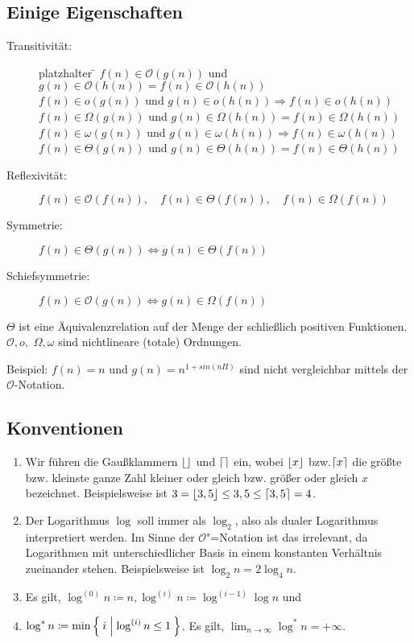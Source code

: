 \documentclass[ngerman,draft,parskip=half*,twoside]{scrreprt}
\theoremstyle{break}
\theoremstyle{nonumberbreak}
\newcommand*{\OO}{\mathcal{O}}      %
\DeclarePairedDelimiter{\floor}{\lfloor}{\rfloor}
\DeclarePairedDelimiter{\ceil}{\lceil}{\rceil}
\begin{document}
\subsection{Einige Eigenschaften}
\begin{description}
\item[Transitivität:]
\begin{tabbing}
platzhalter \= \kill
        \> $f(n) \in \OO(g(n))$ und $g(n) \in \OO(h(n))=f(n) \in \OO(h(n))$\\
        \> $f(n) \in o(g(n))$ und $g(n) \in o(h(n)) \Rightarrow f(n) \in o(h(n))$\\
        \> $f(n) \in \Omega(g(n))$ und $g(n) \in \Omega(h(n))=f(n) \in \Omega(h(n))$\\
        \> $f(n) \in \omega(g(n))$ und $g(n) \in \omega(h(n)) \Rightarrow f(n) \in \omega(h(n))$\\
        \> $f(n) \in \Theta(g(n))$ und $g(n) \in \Theta(h(n))=f(n) \in \Theta(h(n))$
\end{tabbing}
\item[Reflexivität:]
        $f(n) \in \OO(f(n)), \quad f(n) \in \Theta(f(n)), \quad f(n) \in \Omega(f(n))$
\item[Symmetrie:]
        $f(n) \in \Theta(g(n)) \Leftrightarrow g(n) \in \Theta(f(n))$
\item[Schiefsymmetrie:]
        $f(n) \in \OO(g(n)) \Leftrightarrow g(n) \in \Omega(f(n))$
\end{description}
$\Theta$ ist eine Äquivalenzrelation auf der Menge der schließlich positiven Funktionen.
$\OO,o,$ $\Omega,\omega$ sind nichtlineare (totale) Ordnungen.

Beispiel: $f(n)=n$ und $g(n)=n^{1+sin(n\Pi)}$ sind nicht vergleichbar mittels der $\OO$-Notation.

\subsection{Konventionen}
\begin{enumerate}
\item   Wir führen die Gaußklammern $\floor{}$ und $\ceil{}$ ein,
  wobei $\floor{x}$ bzw.$\ceil{x}$ die größte bzw. kleinste ganze Zahl
  kleiner oder gleich bzw. größer oder gleich $x$
  bezeichnet. Beispielsweise ist $3=\floor{3,5}\leq
  3,5\leq\ceil{3,5}=4$.
\item Der Logarithmus $\log$ soll immer als $\log_2$, also als dualer
  Logarithmus interpretiert werden. Im Sinne der $\OO$"=Notation ist
  das irrelevant, da Logarithmen mit unterschiedlicher Basis in einem
  konstanten Verhältnis zueinander stehen. Beispielsweise ist $\log_2 n =
  2 \log_4 n$.
\item  Es gilt, $\log^{(0)}n \coloneqq n, \log^{(i)}n \coloneqq
  \log^{(i-1)}\log n$ und
\item   $\log^{*}n \coloneqq \min \Set{i |\log^{(i)}n \leq1}$. Es
  gilt, $\lim_{n \rightarrow \infty}{\log^{*}n} = + \infty$.
\end{enumerate}
\end{document}
